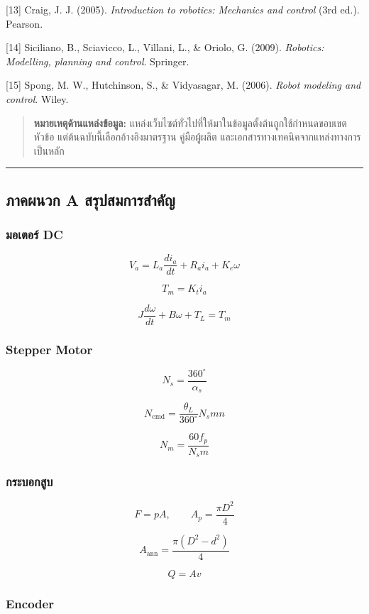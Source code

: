 [13] Craig, J. J. (2005). \textit{Introduction to robotics: Mechanics and control} (3rd ed.). Pearson.

[14] Siciliano, B., Sciavicco, L., Villani, L., \& Oriolo, G. (2009). \textit{Robotics: Modelling, planning and control}. Springer.

[15] Spong, M. W., Hutchinson, S., \& Vidyasagar, M. (2006). \textit{Robot modeling and control}. Wiley.

\begin{quote}
    \textbf{หมายเหตุด้านแหล่งข้อมูล:} แหล่งเว็บไซต์ทั่วไปที่ให้มาในข้อมูลตั้งต้นถูกใช้กำหนดขอบเขตหัวข้อ แต่ต้นฉบับนี้เลือกอ้างอิงมาตรฐาน คู่มือผู้ผลิต และเอกสารทางเทคนิคจากแหล่งทางการเป็นหลัก
\end{quote}

\par\noindent\rule{\textwidth}{0.4pt}\par

\subsection{ภาคผนวก A สรุปสมการสำคัญ}

\subsubsection{มอเตอร์ DC}

\[
V_a=L_a\frac{di_a}{dt}+R_ai_a+K_e\omega
\]

\[
T_m=K_ti_a
\]

\[
J\frac{d\omega}{dt}+B\omega+T_L=T_m
\]

\subsubsection{Stepper Motor}

\[
N_s=\frac{360^\circ}{\alpha_s}
\]

\[
N_{\text{cmd}}
=
\frac{\theta_L}{360^\circ}N_smn
\]

\[
N_m=\frac{60f_p}{N_sm}
\]

\subsubsection{กระบอกสูบ}

\[
F=pA,\qquad A_p=\frac{\pi D^2}{4}
\]

\[
A_{\text{ann}}=\frac{\pi(D^2-d^2)}{4}
\]

\[
Q=Av
\]

\subsubsection{Encoder}

